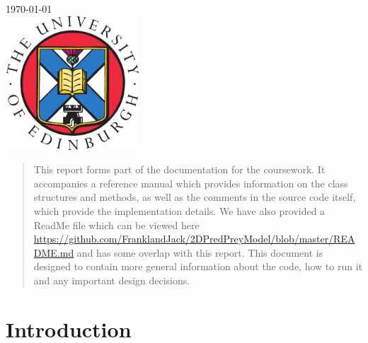 \begin{titlepage}

{\large \today}\\[2cm] %


\includegraphics[width=5cm, height=5cm]{logo.png}\\[5cm] %
 

\vfill %

\end{titlepage}


\begin{abstract}
This report forms part of the documentation for the coursework. It accompanies a reference manual which provides information on the class structures and methods, as well as the comments in the source code itself, which provide the implementation details. We have also provided a ReadMe file which can be viewed here \url{https://github.com/FranklandJack/2DPredPreyModel/blob/master/README.md} and has some overlap with this report. This document is designed to contain more general information about the code, how to run it and any important design decisions. 
\end{abstract}

\section{Introduction}

